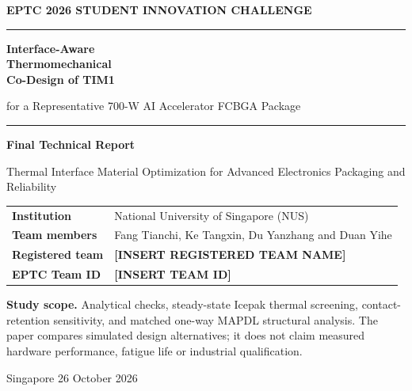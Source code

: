 \documentclass[10pt,a4paper]{article}
\begin{document}
\begin{titlepage}
\thispagestyle{empty}
\vspace*{14mm}
{\small\bfseries\color{midblue} EPTC 2026 STUDENT INNOVATION CHALLENGE}\par
\vspace{4mm}
{\color{midblue}\rule{\linewidth}{1.4pt}}\par
\vspace{14mm}
{\Huge\bfseries\color{ink} Interface-Aware\\[3mm] Thermomechanical\\[3mm] Co-Design of TIM1}\par
\vspace{7mm}
{\Large for a Representative 700-W AI Accelerator FCBGA Package}\par
\vspace{12mm}
{\color{steel}\rule{0.28\linewidth}{0.7pt}}\par
\vspace{9mm}
{\large\bfseries Final Technical Report}\par
{\normalsize\color{steel} Thermal Interface Material Optimization for Advanced Electronics Packaging and Reliability}\par
\vspace{17mm}
\begin{tabularx}{\linewidth}{@{}p{35mm}Y@{}}
\textbf{Institution} & National University of Singapore (NUS)\\[3mm]
\textbf{Team members} & Fang Tianchi, Ke Tangxin, Du Yanzhang and Duan Yihe\\[3mm]
\textbf{Registered team} & \textcolor{BrickRed}{\textbf{[INSERT REGISTERED TEAM NAME]}}\\[3mm]
\textbf{EPTC Team ID} & \textcolor{BrickRed}{\textbf{[INSERT TEAM ID]}}\\
\end{tabularx}
\vfill
\noindent\colorbox{pale}{\parbox{\dimexpr\linewidth-2\fboxsep\relax}{
\small\textbf{Study scope.} Analytical checks, steady-state Icepak thermal screening,
contact-retention sensitivity, and matched one-way MAPDL structural analysis.
The paper compares simulated design alternatives; it does not claim measured hardware
performance, fatigue life or industrial qualification.}}
\vspace{6mm}
{\small\color{steel} Singapore \hfill 26 October 2026}
\end{titlepage}
\setcounter{page}{2}
\end{document}
